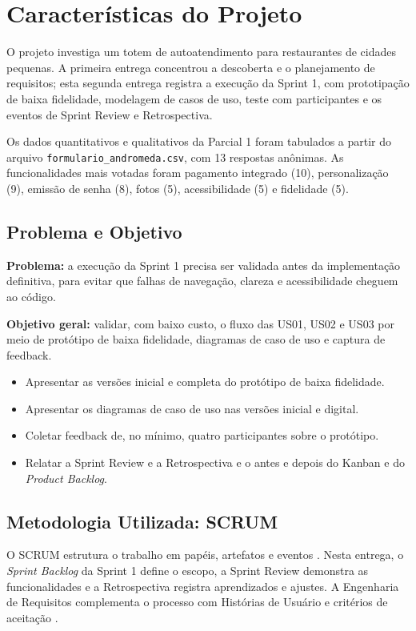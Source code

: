 \documentclass[12pt, oneside, a4paper, chapter=TITLE,section=TITLE]{abntex2}
\begin{document}
\chapter{Características do Projeto}

O projeto investiga um totem de autoatendimento para restaurantes de cidades pequenas. A primeira entrega concentrou a descoberta e o planejamento de requisitos; esta segunda entrega registra a execução da Sprint 1, com prototipação de baixa fidelidade, modelagem de casos de uso, teste com participantes e os eventos de Sprint Review e Retrospectiva.

Os dados quantitativos e qualitativos da Parcial 1 foram tabulados a partir do arquivo \texttt{formulario\_andromeda.csv}, com 13 respostas anônimas. As funcionalidades mais votadas foram pagamento integrado (10), personalização (9), emissão de senha (8), fotos (5), acessibilidade (5) e fidelidade (5).

\section{Problema e Objetivo}

\textbf{Problema:} a execução da Sprint 1 precisa ser validada antes da implementação definitiva, para evitar que falhas de navegação, clareza e acessibilidade cheguem ao código.

\textbf{Objetivo geral:} validar, com baixo custo, o fluxo das US01, US02 e US03 por meio de protótipo de baixa fidelidade, diagramas de caso de uso e captura de feedback.

\begin{itemize}
    \item Apresentar as versões inicial e completa do protótipo de baixa fidelidade.
    \item Apresentar os diagramas de caso de uso nas versões inicial e digital.
    \item Coletar feedback de, no mínimo, quatro participantes sobre o protótipo.
    \item Relatar a Sprint Review e a Retrospectiva e o antes e depois do Kanban e do \textit{Product Backlog}.
\end{itemize}

\section{Metodologia Utilizada: SCRUM}

O SCRUM estrutura o trabalho em papéis, artefatos e eventos \cite{schwaber2017scrum}. Nesta entrega, o \textit{Sprint Backlog} da Sprint 1 define o escopo, a Sprint Review demonstra as funcionalidades e a Retrospectiva registra aprendizados e ajustes. A Engenharia de Requisitos complementa o processo com Histórias de Usuário e critérios de aceitação \cite{wazlawick2019engenharia}.
\end{document}
